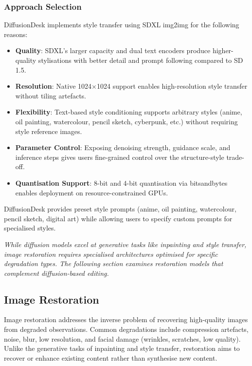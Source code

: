 \documentclass[12pt,a4paper]{report}
\begin{document}
\subsubsection{Approach Selection}

DiffusionDesk implements style transfer using SDXL img2img for the following reasons:

\begin{itemize}
    \item \textbf{Quality}: SDXL's larger capacity and dual text encoders produce higher-quality stylisations with better detail and prompt following compared to SD 1.5.
    \item \textbf{Resolution}: Native 1024$\times$1024 support enables high-resolution style transfer without tiling artefacts.
    \item \textbf{Flexibility}: Text-based style conditioning supports arbitrary styles (anime, oil painting, watercolour, pencil sketch, cyberpunk, etc.) without requiring style reference images.
    \item \textbf{Parameter Control}: Exposing denoising strength, guidance scale, and inference steps gives users fine-grained control over the structure-style trade-off.
    \item \textbf{Quantisation Support}: 8-bit and 4-bit quantisation via bitsandbytes enables deployment on resource-constrained GPUs.
\end{itemize}

DiffusionDesk provides preset style prompts (anime, oil painting, watercolour, pencil sketch, digital art) while allowing users to specify custom prompts for specialised styles.

\vspace{1em}
\noindent\textit{While diffusion models excel at generative tasks like inpainting and style transfer, image restoration requires specialised architectures optimised for specific degradation types. The following section examines restoration models that complement diffusion-based editing.}

\subsection{Image Restoration}

Image restoration addresses the inverse problem of recovering high-quality images from degraded observations. Common degradations include compression artefacts, noise, blur, low resolution, and facial damage (wrinkles, scratches, low quality). Unlike the generative tasks of inpainting and style transfer, restoration aims to recover or enhance existing content rather than synthesise new content.
\end{document}
